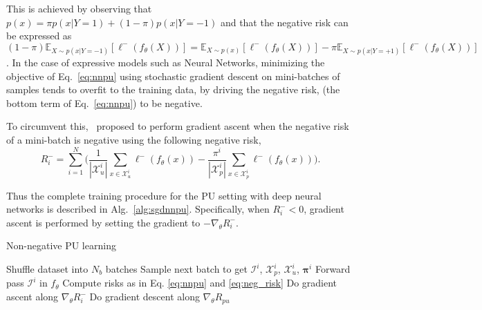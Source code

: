 This is achieved by observing that $p(x) = \pi p(x|Y=1) + (1-\pi) p(x|Y=-1)$ and that the negative risk can be expressed as $ (1-\pi) \mathbb{E}_{X \sim p(x|Y=-1)}\left[\ell^-(f_\theta(X)) \right] =
\mathbb{E}_{X \sim p(x)}\left[\ell^-(f_\theta(X)) \right] - \pi \mathbb{E}_{X \sim p(x|Y=+1)}\left[\ell^-(f_\theta(X)) \right]$. In the case of expressive models such as Neural Networks, minimizing the objective of Eq.~\eqref{eq:nnpu} using stochastic gradient descent on mini-batches of samples tends to overfit to the training data, by driving the negative risk, (\ie the bottom term of Eq.~\eqref{eq:nnpu}) to be negative.

To circumvent this,~\cite{kiryo17} proposed to perform gradient ascent when the negative risk of a mini-batch is negative using the following negative risk,
\begin{equation}
  \label{eq:neg_risk}
R_{i}^{-}=\sum_{i=1}^N\Biggl(
 \frac{1}{|\mathcal{X}^{i}_{u}|}\sum_{x \in \mathcal{X}^{i}_u}\ell^-(f_{\theta}(x)) - 
\frac{\pi^{i}}{|\mathcal{X}^{i}_{p}|}\sum_{x \in \mathcal{X}^{i}_p}\ell^-(f_{\theta}(x)) \Biggr).
\end{equation}

Thus the complete training procedure for the PU setting with deep neural networks is described in Alg.~\ref{alg:sgdnnpu}. Specifically, when \(R_{i}^{-} < 0\), gradient ascent is performed by setting the gradient to \(-\nabla_\theta R_{i}^{-}\). 
\begin{algorithm}[H]
\caption{Non-negative PU learning}
\label{alg:sgdnnpu}
\begin{algorithmic}[1]
\State Shuffle dataset into $N_{b}$ batches
     \State Sample next batch to get $\mathcal{I}^i$, $\mathcal{X}_p^i$, $\mathcal{X}_u^i$, $\bm{\pi}^i$
	\State Forward pass $\mathcal{I}^i$ in $f_\theta$
	\State Compute risks as in Eq. \ref{eq:nnpu} and \ref{eq:neg_risk}
          \State Do gradient ascent along $\nabla_\theta R_{i}^{-}$
      \Else
          \State Do gradient descent along $\nabla_\theta R_{pu}$
      \EndIf
  \EndFor
\EndFor
\end{algorithmic}
\end{algorithm}

